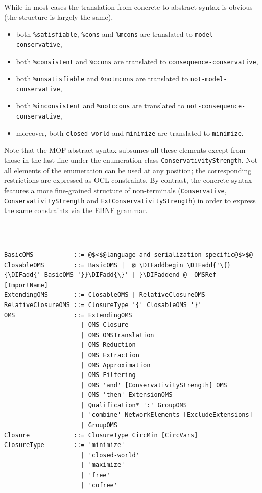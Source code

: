 \documentclass[10pt, a4paper]{isov2}
\newcommand{\bc}[1]{~\\{\color{violet}\large \hrulefill \href{http://issues.omg.org/browse/DOL-#1}{\normalfont{JIRA DOL-{}#1}} \hrulefill\\}  }
\newcommand{\ec}[0]{~\\{{\color{violet}\large \hrulefill {\normalfont{end}} \hrulefill\\}  }}
\newcommand*{\syntax}[1]{\texttt{#1}}
\providecommand{\DIFaddtex}[1]{{\protect\color{blue}\uwave{#1}}} %
\providecommand{\DIFaddbegin}{} %
\providecommand{\DIFaddend}{} %
\providecommand{\DIFadd}[1]{\texorpdfstring{\DIFaddtex{#1}}{#1}} %
\begin{document}
While in most cases the translation from concrete to abstract syntax
is obvious (the structure is largely the same),  
 \begin{itemize} 
\item both \syntax{\%satisfiable}, \syntax{\%cons} and \syntax{\%mcons} are translated
  to \syntax{model-conservative},
\item both \syntax{\%consistent}  and \syntax{\%ccons} are translated
  to \syntax{consequence-conservative},
\item  both   \syntax{\%unsatisfiable} and \syntax{\%notmcons} are translated to
  \syntax{not-model-conservative},
\item both \syntax{\%inconsistent}  and \syntax{\%notccons} are translated
  to \syntax{not-consequence-conservative},
\item moreover, both \syntax{closed-world} and \syntax{minimize} are
  translated to \syntax{minimize}.
 \end{itemize} 
Note that the MOF abstract syntax subsumes all these elements except
from those in the last line under the enumeration class
\syntax{ConservativityStrength}. Not all elements of the enumeration
can be used at any position; the corresponding restrictions are
expressed as OCL constraints.  By contrast, the concrete syntax
features a more fine-grained structure of non-terminals
(\syntax{Conservative}, \syntax{ConservativityStrength} and
\syntax{ExtConservativityStrength}) in order to express the same
constraints via the EBNF grammar.

\bc{94}

\begin{lstlisting}[language=ebnf,escapeinside={@@},mathescape]
BasicOMS           ::= @$<$@language and serialization specific@$>$@ 
ClosableOMS        ::= BasicOMS |  @ \DIFaddbegin \DIFadd{'\{}{\DIFadd{' BasicOMS '}}\DIFadd{\}' | }\DIFaddend @  OMSRef [ImportName]
ExtendingOMS       ::= ClosableOMS | RelativeClosureOMS
RelativeClosureOMS ::= ClosureType '{' ClosableOMS '}'
OMS                ::= ExtendingOMS
                     | OMS Closure
                     | OMS OMSTranslation
                     | OMS Reduction
                     | OMS Extraction
                     | OMS Approximation
                     | OMS Filtering
                     | OMS 'and' [ConservativityStrength] OMS
                     | OMS 'then' ExtensionOMS
                     | Qualification* ':' GroupOMS
                     | 'combine' NetworkElements [ExcludeExtensions]
                     | GroupOMS
Closure            ::= ClosureType CircMin [CircVars]
ClosureType        ::= 'minimize'
                     | 'closed-world'
                     | 'maximize'
                     | 'free'
                     | 'cofree'
\end{lstlisting}
\ec
\end{document}
